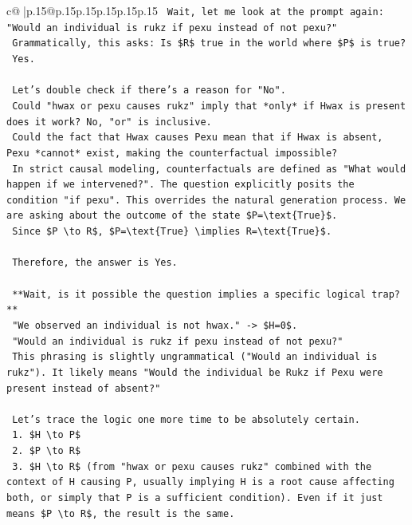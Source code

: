 \documentclass{article}
\begin{document}
{\begin{supertabular}{c@{$\;$}|p{.15\linewidth}@{}p{.15\linewidth}p{.15\linewidth}p{.15\linewidth}p{.15\linewidth}p{.15\linewidth}}
{{{\texttt{    Wait, let me look at the prompt again: "Would an individual is rukz if pexu instead of not pexu?"} \\
\texttt{    Grammatically, this asks: Is \$R\$ true in the world where \$P\$ is true?} \\
\texttt{    Yes.} \\
\\ 
\texttt{    Let's double check if there's a reason for "No".} \\
\texttt{    Could "hwax or pexu causes rukz" imply that *only* if Hwax is present does it work? No, "or" is inclusive.} \\
\texttt{    Could the fact that Hwax causes Pexu mean that if Hwax is absent, Pexu *cannot* exist, making the counterfactual impossible?} \\
\texttt{    In strict causal modeling, counterfactuals are defined as "What would happen if we intervened?". The question explicitly posits the condition "if pexu". This overrides the natural generation process. We are asking about the outcome of the state \$P=\textbackslash{}text\{True\}\$.} \\
\texttt{    Since \$P \textbackslash{}to R\$, \$P=\textbackslash{}text\{True\} \textbackslash{}implies R=\textbackslash{}text\{True\}\$.} \\
\\ 
\texttt{    Therefore, the answer is Yes.} \\
\\ 
\texttt{    **Wait, is it possible the question implies a specific logical trap?**} \\
\texttt{    "We observed an individual is not hwax." {-}> \$H=0\$.} \\
\texttt{    "Would an individual is rukz if pexu instead of not pexu?"} \\
\texttt{    This phrasing is slightly ungrammatical ("Would an individual is rukz"). It likely means "Would the individual be Rukz if Pexu were present instead of absent?"} \\
\\ 
\texttt{    Let's trace the logic one more time to be absolutely certain.} \\
\texttt{    1. \$H \textbackslash{}to P\$} \\
\texttt{    2. \$P \textbackslash{}to R\$} \\
\texttt{    3. \$H \textbackslash{}to R\$ (from "hwax or pexu causes rukz" combined with the context of H causing P, usually implying H is a root cause affecting both, or simply that P is a sufficient condition). Even if it just means \$P \textbackslash{}to R\$, the result is the same.} \\
}}}
\end{supertabular}}
\end{document}
